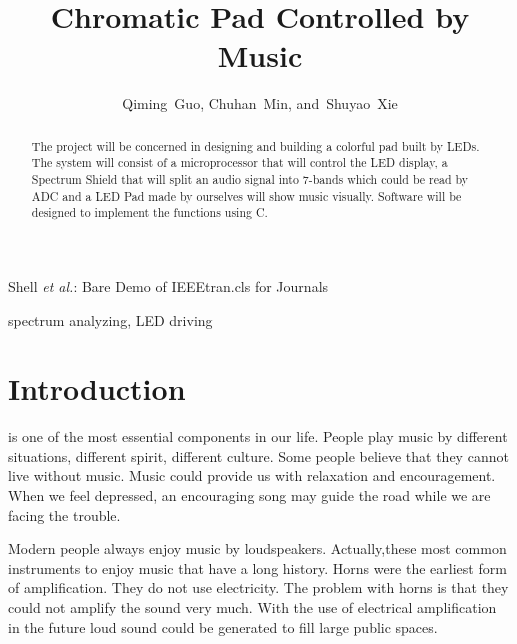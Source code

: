 \documentclass[12pt,a4paper,journal]{IEEEtran}
\begin{document}
\title{Chromatic Pad Controlled by Music}


\author{Qiming~Guo,
        Chuhan~Min,
        and~Shuyao~Xie%
        }


%
{Shell \MakeLowercase{\textit{et al.}}: Bare Demo of IEEEtran.cls for Journals}

\maketitle

\begin{abstract}
The project will be concerned in designing and building a colorful pad built by LEDs. The system will consist of a microprocessor that will control the LED display, a Spectrum Shield that will split an audio signal into 7-bands which could be read by ADC and a LED Pad made by ourselves will show music visually. Software will be designed to implement the functions using C. 
\end{abstract}

\begin{IEEEkeywords}
spectrum analyzing, LED driving
\end{IEEEkeywords}

\section{Introduction}
 is one of the most essential components in our life. People play music by different situations, different spirit, different culture. Some people believe that they cannot live without music. Music could provide us with relaxation and encouragement. When we feel depressed, an encouraging song may guide the road while we are facing the trouble.

Modern people always enjoy music by loudspeakers. Actually,these most common instruments to enjoy music that have a long history. Horns were the earliest form of amplification. They do not use electricity. The problem with horns is that they could not amplify the sound very much. With the use of electrical amplification in the future loud sound could be generated to fill large public spaces.
\end{document}
